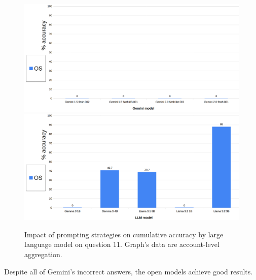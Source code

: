 \documentclass[12pt]{article}
\begin{document}
\begin{figure}[H]
    \centering
            \includegraphics[width=1\textwidth]{q205Gemini.png}
            \includegraphics[width=1\textwidth]{q205Other.png}
    \caption[Accuracy on Question 11 by LLM]{Impact of prompting strategies on cumulative accuracy by large language model on question 11. Graph's data are account-level aggregation.}
    \end{figure} 
Despite all of Gemini's incorrect answers, the open models achieve good results.\\

\vspace{2cm}

\end{document}
